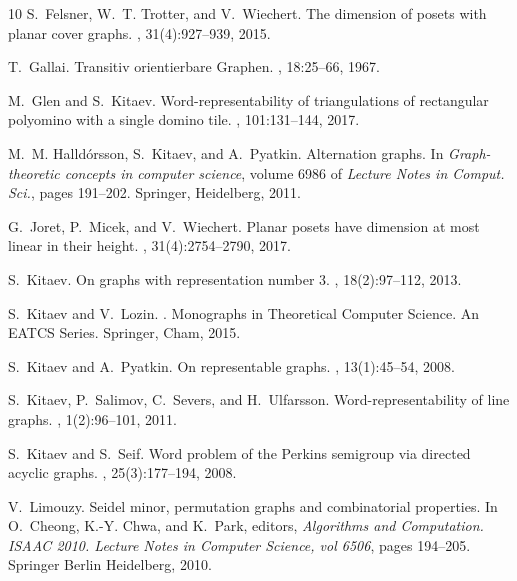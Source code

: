 \documentclass{llncs}
\begin{document}
\begin{thebibliography}{10}
	S.~Felsner, W.~T. Trotter, and V.~Wiechert.
	\newblock The dimension of posets with planar cover graphs.
	, 31(4):927--939, 2015.
	
	T.~Gallai.
	\newblock Transitiv orientierbare {G}raphen.
	, 18:25--66, 1967.
	
	M.~Glen and S.~Kitaev.
	\newblock Word-representability of triangulations of rectangular polyomino with
	a single domino tile.
	, 101:131--144, 2017.
	
	M.~M. Halld\'{o}rsson, S.~Kitaev, and A.~Pyatkin.
	\newblock Alternation graphs.
	\newblock In {\em Graph-theoretic concepts in computer science}, volume 6986 of
	{\em Lecture Notes in Comput. Sci.}, pages 191--202. Springer, Heidelberg,
	2011.
	
	G.~Joret, P.~Micek, and V.~Wiechert.
	\newblock Planar posets have dimension at most linear in their height.
	, 31(4):2754--2790, 2017.
	
	S.~Kitaev.
	\newblock On graphs with representation number 3.
	, 18(2):97--112, 2013.
	
	S.~Kitaev and V.~Lozin.
	.
	\newblock Monographs in Theoretical Computer Science. An EATCS Series.
	Springer, Cham, 2015.
	
	S.~Kitaev and A.~Pyatkin.
	\newblock On representable graphs.
	, 13(1):45--54, 2008.
	
	S.~Kitaev, P.~Salimov, C.~Severs, and H.~Ulfarsson.
	\newblock Word-representability of line graphs.
	, 1(2):96--101, 2011.
	
	S.~Kitaev and S.~Seif.
	\newblock Word problem of the {P}erkins semigroup via directed acyclic graphs.
	, 25(3):177--194, 2008.
	
	V.~Limouzy.
	\newblock Seidel minor, permutation graphs and combinatorial properties.
	\newblock In O.~Cheong, K.-Y. Chwa, and K.~Park, editors, {\em Algorithms and
		Computation. ISAAC 2010. Lecture Notes in Computer Science, vol 6506}, pages
	194--205. Springer Berlin Heidelberg, 2010.
	

\end{thebibliography}
\end{document}
